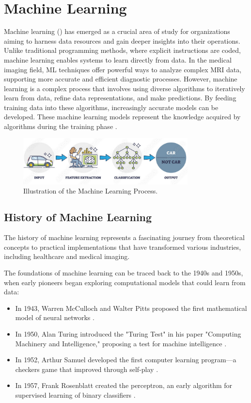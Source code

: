 \section{Machine Learning}
\label{sec:ml}
Machine learning () has emerged as a crucial area of study for organizations aiming to harness data resources and gain deeper insights into their operations. Unlike traditional programming methods, where explicit instructions are coded, machine learning enables systems to learn directly from data. In the medical imaging field, ML techniques offer powerful ways to analyze complex MRI data, supporting more accurate and efficient diagnostic processes. However, machine learning is a complex process that involves using diverse algorithms to iteratively learn from data, refine data representations, and make predictions. By feeding training data into these algorithms, increasingly accurate models can be developed. These machine learning models represent the knowledge acquired by algorithms during the training phase \cite{hurwitz2018mlfd}.

\begin{figure}[H]
  \centering
  \includegraphics[width=0.8\textwidth]{Images/Chapter1/ml.png}
  \caption{Illustration of the Machine Learning Process. \cite{alltius2025deeplearning}}
  \label{fig:ml}
\end{figure}

\subsection{History of Machine Learning}
\label{sec:ml_history}
The history of machine learning represents a fascinating journey from theoretical concepts to practical implementations that have transformed various industries, including healthcare and medical imaging.

The foundations of machine learning can be traced back to the 1940s and 1950s, when early pioneers began exploring computational models that could learn from data:

\begin{itemize}
  \item In 1943, Warren McCulloch and Walter Pitts proposed the first mathematical model of neural networks \cite{mcculloch1943logical}.
  \item In 1950, Alan Turing introduced the "Turing Test" in his paper "Computing Machinery and Intelligence," proposing a test for machine intelligence \cite{turing1950computing}.
  \item In 1952, Arthur Samuel developed the first computer learning program—a checkers game that improved through self-play \cite{samuel1959studies}.
  \item In 1957, Frank Rosenblatt created the perceptron, an early algorithm for supervised learning of binary classifiers \cite{rosenblatt1958perceptron}.
\end{itemize}

